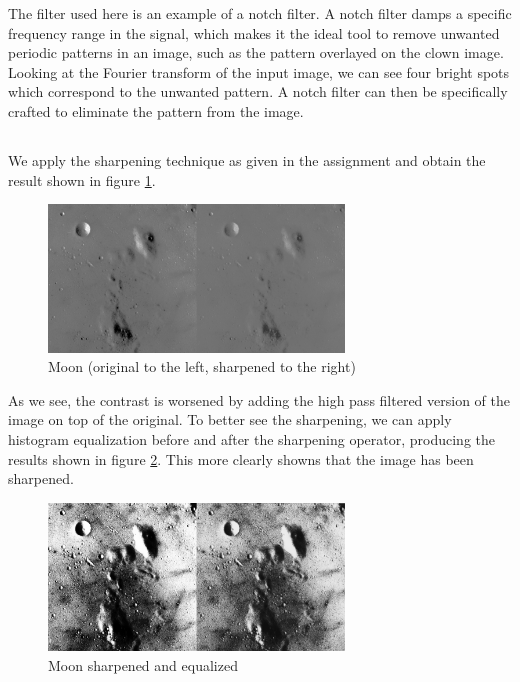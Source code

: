 \documentclass[]{article}
\begin{document}
The filter used here is an example of a notch filter. A notch filter damps a specific frequency range in the signal, which makes it the ideal tool to remove unwanted periodic patterns in an image, such as the pattern overlayed on the clown image. Looking at the Fourier transform of the input image, we can see four bright spots which correspond to the unwanted pattern. A notch filter can then be specifically crafted to eliminate the pattern from the image.

\subsection{}
We apply the sharpening technique as given in the assignment and obtain the result shown in figure \ref{fig:moon_sharpened_bad}.
\begin{figure}[H]
\centering
\includegraphics[width=0.7\textwidth]{moon_sharpened_bad_contrast}
\caption{Moon (original to the left, sharpened to the right)}
\label{fig:moon_sharpened_bad}
\end{figure}
As we see, the contrast is worsened by adding the high pass filtered version of the image on top of the original. To better see the sharpening, we can apply histogram equalization before and after the sharpening operator, producing the results shown in figure \ref{fig:moon_sharpened_good}. This more clearly showns that the image has been sharpened.
\begin{figure}[H]
\centering
\includegraphics[width=0.7\textwidth]{moon_sharpened}
\caption{Moon sharpened and equalized}
\label{fig:moon_sharpened_good}
\end{figure}
\end{document}
